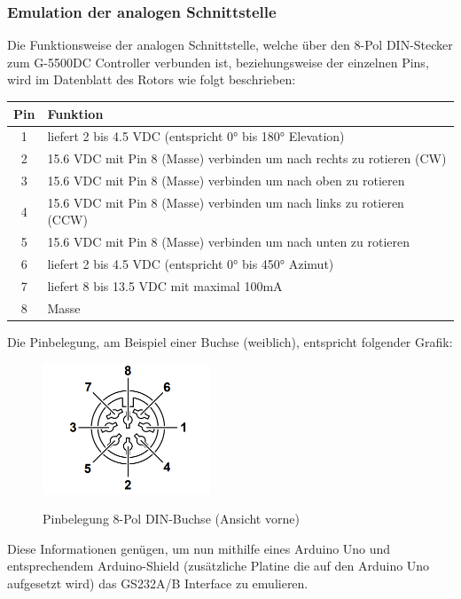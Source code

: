 \subsubsection{Emulation der analogen Schnittstelle}
Die Funktionsweise der analogen Schnittstelle, welche über den 8-Pol DIN-Stecker zum G-5500DC Controller verbunden ist, beziehungsweise der einzelnen Pins, wird im Datenblatt des Rotors \cite{noauthor_yaesu_nodate} wie folgt beschrieben:

\begin{tabular}{| c | l |}
	\hline
	\textbf{Pin} & \textbf{Funktion} \\
	\hline
	1 & liefert 2 bis 4.5 VDC (entspricht 0° bis 180° Elevation) \\
	\hline
	2 & 15.6 VDC mit Pin 8 (Masse) verbinden um nach rechts zu rotieren (CW) \\
	\hline
	3 & 15.6 VDC mit Pin 8 (Masse) verbinden um nach oben zu rotieren \\
	\hline
	4 & 15.6 VDC mit Pin 8 (Masse) verbinden um nach links zu rotieren (CCW) \\
	\hline
	5 & 15.6 VDC mit Pin 8 (Masse) verbinden um nach unten zu rotieren \\
	\hline
	6 & liefert 2 bis 4.5 VDC (entspricht 0° bis 450° Azimut) \\
	\hline
	7 & liefert 8 bis 13.5 VDC mit maximal 100mA \\
	\hline
	8 & Masse \\
	\hline
\end{tabular}

Die Pinbelegung, am Beispiel einer Buchse (weiblich), entspricht folgender Grafik: 
\begin{figure}[H]
	\cite{noauthor_yaesu_nodate}
	\centering
	\includegraphics[width=5cm]{../ref/RotorInterfacePinbelegung.png}
	\label{fig:Rotor_Interface_Pinbelegung}
	\caption{Pinbelegung 8-Pol DIN-Buchse (Ansicht vorne)}
\end{figure}

Diese Informationen genügen, um nun mithilfe eines Arduino Uno und entsprechendem Arduino-Shield (zusätzliche Platine die auf den Arduino Uno aufgesetzt wird) das GS232A/B Interface zu emulieren.

